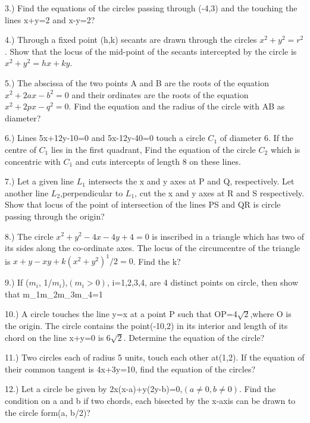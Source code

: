 \documentclass{article}
\begin{document}
\vspace{5mm}
3.) Find the equations of the circles passing through (-4,3) and the touching the lines x+y=2 and x-y=2?

\vspace{5mm}
4.) Through a fixed point (h,k) secants are drawn through the circles $x^2+y^2=r^2$. Show that the locus of the mid-point of the secants intercepted by the circle is $x^2+y^2=hx+ky$.

\vspace{5mm}
5.) The abscissa of the two points A and B are the roots of the equation $x^2+2ax-b^2=0$ and their ordinates are the roots of the equation $x^2+2px-q^2=0$. Find the equation and the radius of the circle with AB as diameter?

\vspace{5mm}
6.) Lines 5x+12y-10=0 and 5x-12y-40=0 touch a circle $C_1$ of diameter 6. If the centre of $C_1$ lies in the first quadrant, Find the equation of the circle $C_2$ which is concentric with $C_1$ and cuts intercepts of length 8 on these lines.

\vspace{5mm}
7.) Let a given line $L_1$ intersects the x and y axes at P and Q, respectively. Let another line $L_2$,perpendicular to $L_1$, cut the x and y axes at R and S respectively. Show that locus of the point of intersection of the lines PS and QR is circle passing through the origin?

\vspace{5mm}
8.) The circle $x^2+y^2-4x-4y+4=0$ is inscribed in a triangle which has two of its sides along the co-ordinate axes. The locus of the circumcentre of the triangle is $x+y-xy+k(x^2+y^2)^1/2=0$. Find the k?

\vspace{5mm}
9.) If ($m_i$, 1/$m_i$),$(m_i > 0)$, i=1,2,3,4, are 4 distinct points on circle, then show that m_1m_2m_3m_4=1

\vspace{5mm}
10.) A circle touches the line y=x at a point P such that OP=4$\sqrt{2}$,where O is the origin. The circle contains the point(-10,2) in its interior and length of its chord on the line x+y=0 is 6$\sqrt{2}$. Determine the equation of the circle?

\vspace{5mm}
11.) Two circles each of radius 5 units, touch each other at(1,2). If the equation of their common tangent is 4x+3y=10, find the equation of the circles?

\vspace{5mm}
12.) Let a circle be given by 2x(x-a)+y(2y-b)=0,$(a\neq0,b\neq0)$. Find the condition on a and b if two chords, each bisected by the x-axis can be drawn to the circle form(a, b/2)?
\end{document}
